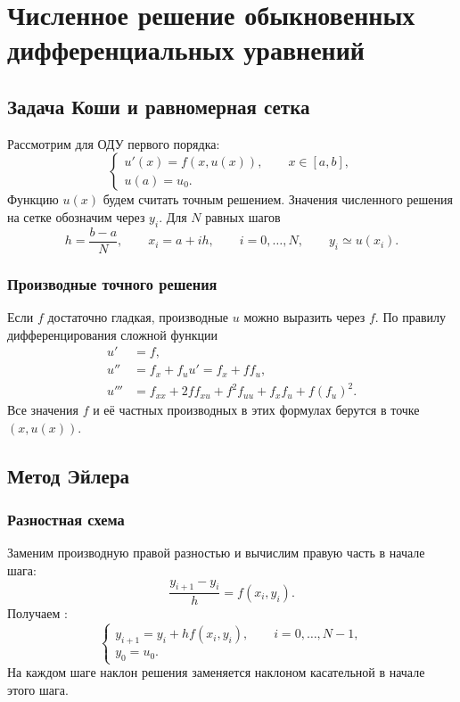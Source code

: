 \documentclass[../final.tex]{subfiles}
\begin{document}
\chapter{Численное решение обыкновенных дифференциальных уравнений}

\section{Задача Коши и равномерная сетка}

Рассмотрим  для ОДУ первого порядка:
\begin{equation*}
    \begin{cases}
        u'(x)=f(x,u(x)),\qquad x\in[a,b],\\
        u(a)=u_0.
    \end{cases}
\end{equation*}
Функцию $u(x)$ будем считать точным решением.
Значения численного решения на сетке обозначим через $y_i$.
Для $N$ равных шагов
\begin{equation*}
    h=\frac{b-a}{N},\qquad x_i=a+ih,\qquad i=0,\ldots,N,
    \qquad y_i\simeq u(x_i).
\end{equation*}

\subsection{Производные точного решения}

Если $f$ достаточно гладкая, производные $u$ можно выразить через $f$.
По правилу дифференцирования сложной функции
\begin{align*}
    u'&=f,\\
    u''&=f_x+f_u u'=f_x+ff_u,\\
    u'''&=f_{xx}+2ff_{xu}+f^2f_{uu}+f_xf_u+f(f_u)^2.
\end{align*}
Все значения $f$ и её частных производных в этих формулах берутся
в точке $(x,u(x))$.

\section{Метод Эйлера}

\subsection{Разностная схема}

Заменим производную правой разностью и вычислим правую часть
в начале шага:
\begin{equation*}
    \frac{y_{i+1}-y_i}{h}=f(x_i,y_i).
\end{equation*}
Получаем :
\begin{equation*}
    \begin{cases}
        y_{i+1}=y_i+h f(x_i,y_i),\qquad i=0,\ldots,N-1,\\
        y_0=u_0.
    \end{cases}
\end{equation*}
На каждом шаге наклон решения заменяется наклоном касательной
в начале этого шага.
\end{document}
